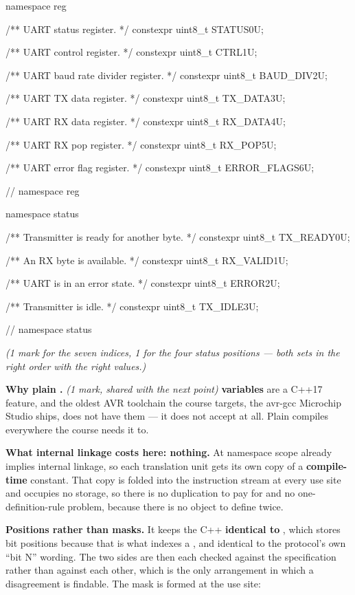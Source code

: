 \begin{cppcode}
namespace reg
{
/** UART status register. */
constexpr uint8_t STATUS{0U};

/** UART control register. */
constexpr uint8_t CTRL{1U};

/** UART baud rate divider register. */
constexpr uint8_t BAUD_DIV{2U};

/** UART TX data register. */
constexpr uint8_t TX_DATA{3U};

/** UART RX data register. */
constexpr uint8_t RX_DATA{4U};

/** UART RX pop register. */
constexpr uint8_t RX_POP{5U};

/** UART error flag register. */
constexpr uint8_t ERROR_FLAGS{6U};
} // namespace reg

namespace status
{
/** Transmitter is ready for another byte. */
constexpr uint8_t TX_READY{0U};

/** An RX byte is available. */
constexpr uint8_t RX_VALID{1U};

/** UART is in an error state. */
constexpr uint8_t ERROR{2U};

/** Transmitter is idle. */
constexpr uint8_t TX_IDLE{3U};
} // namespace status
\end{cppcode}

{\itshape (1 mark for the seven indices, 1 for the four status positions --- both sets in the right
order with the right values.)\par}

\medskip
\textbf{Why plain .} \textit{(1 mark, shared with the next point)} 
\textbf{variables} are a C++17 feature, and the oldest AVR toolchain the course targets, the avr-gcc
Microchip Studio ships, does not have them --- it does not accept  at all. Plain
 compiles everywhere the course needs it to.

\textbf{What internal linkage costs here: nothing.} At namespace scope  already
implies internal linkage, so each translation unit gets its own copy of a \textbf{compile-time}
constant. That copy is folded into the instruction stream at every use site and occupies no storage,
so there is no duplication to pay for and no one-definition-rule problem, because there is no object
to define twice.

\textbf{Positions rather than masks.} It keeps the C++ \textbf{identical to },
which stores  bit positions because that is what indexes a ,
and identical to the protocol's own ``bit N'' wording. The two sides are then each checked against
the specification rather than against each other, which is the only arrangement in which a
disagreement is findable. The mask is formed at the use site:


